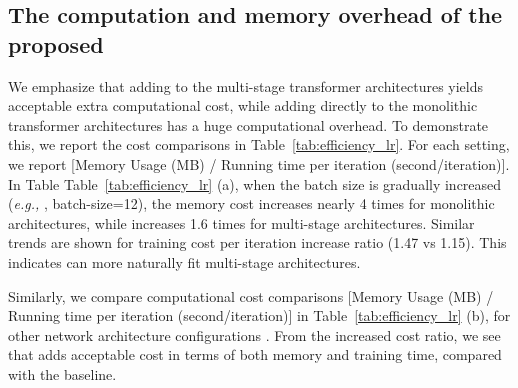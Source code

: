 \documentclass{article} \usepackage{iclr2022_conference,times}
\newcommand{\eg}[0]{\emph{e.g., }}
\begin{document}
\subsection{The computation and memory overhead of the proposed }
\label{sec:lr_efficiency}
We emphasize that adding  to the multi-stage transformer architectures yields acceptable extra computational cost, while adding   directly to the monolithic transformer architectures has a huge computational overhead. To demonstrate this, we report the cost comparisons in Table~\ref{tab:efficiency_lr}. For each setting, we report [Memory Usage (MB) / Running time per iteration (second/iteration)]. In Table Table~\ref{tab:efficiency_lr} (a), when the batch size is gradually increased (\eg, batch-size=12), the memory cost increases nearly 4 times for monolithic architectures, while increases 1.6 times for multi-stage architectures. Similar trends are shown for training cost per iteration increase ratio (1.47 vs 1.15). This indicates  can more naturally fit multi-stage architectures.

Similarly, we compare computational cost comparisons [Memory Usage (MB) / Running time per iteration (second/iteration)] in Table~\ref{tab:efficiency_lr} (b), for other network architecture configurations . From the increased cost ratio, we see that  adds  acceptable cost in terms of both memory and training time, compared with the baseline.
\end{document}
